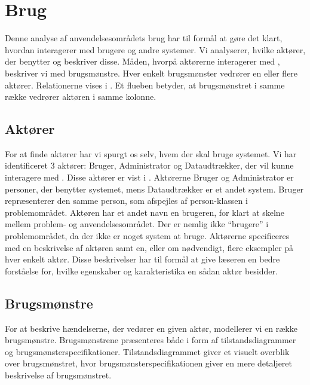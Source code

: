 \section{Brug}
\label{sec:brug}
Denne analyse af anvendelsesområdets brug har til formål at gøre det klart, hvordan \Foodl{} interagerer med brugere og andre systemer. Vi analyserer, hvilke aktører, der benytter \Foodl{} og beskriver disse. Måden, hvorpå aktørerne interagerer med \Foodl{}, beskriver vi med brugsmønstre. Hver enkelt brugsmønster vedrører en eller flere aktører. Relationerne vises i . Et flueben betyder, at brugsmønstret i samme række vedrører aktøren i samme kolonne.



\subsection{Aktører}
\label{sec:aktoerer}
For at finde aktører har vi spurgt os selv, hvem der skal bruge systemet. Vi har identificeret 3 aktører: Bruger, Administrator og Dataudtrækker, der vil kunne interagere med \Foodl{}. Disse aktører er vist i . Aktørerne Bruger og Administrator er personer, der benytter systemet, mens Dataudtrækker er et andet system. Bruger repræsenterer den samme person, som afspejles af person-klassen i problemområdet. Aktøren har et andet navn en brugeren, for klart at skelne mellem problem- og anvendelsesområdet. Der er nemlig ikke ``brugere'' i problemområdet, da der ikke er noget system at bruge. Aktørerne specificeres med en beskrivelse af aktøren samt en, eller om nødvendigt, flere eksempler på hver enkelt aktør. Disse beskrivelser har til formål at give læseren en bedre forståelse for, hvilke egenskaber og karakteristika en sådan aktør besidder. 



\subsection{Brugsmønstre}
\label{subsec:brugsmoenstre}
For at beskrive hændelserne, der vedører en given aktør, modellerer vi en række brugsmønstre. Brugsmønstrene præsenteres både i form af  tilstandsdiagrammer og brugsmønsterspecifikationer. Tilstandsdiagrammet giver et visuelt overblik over brugsmønstret, hvor brugsmønsterspecifikationen giver en mere detaljeret beskrivelse af brugsmønstret.

